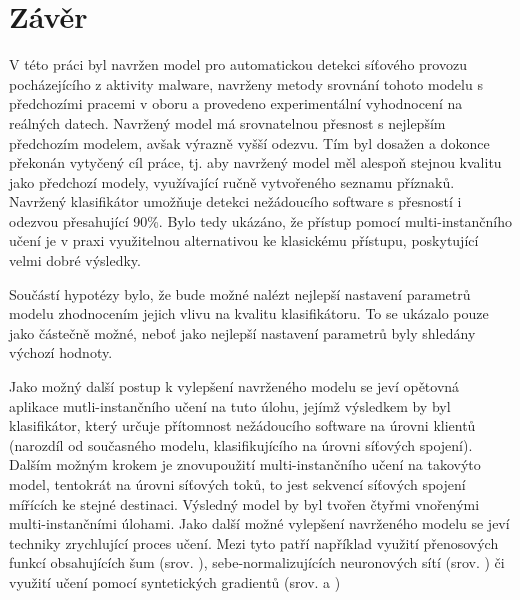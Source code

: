 \chapter*{Závěr}

V této práci byl navržen model pro automatickou detekci síťového provozu pocházejícího z aktivity malware, navrženy metody srovnání tohoto modelu s předchozími pracemi v oboru a provedeno experimentální vyhodnocení na reálných datech. Navržený model má srovnatelnou přesnost s nejlepším předchozím modelem, avšak výrazně vyšší odezvu. Tím byl dosažen a dokonce překonán vytyčený cíl práce, tj. aby navržený model měl alespoň stejnou kvalitu jako předchozí modely, využívající ručně vytvořeného seznamu příznaků. Navržený klasifikátor umožňuje detekci nežádoucího software s přesností i odezvou přesahující 90\%. Bylo tedy ukázáno, že přístup pomocí multi-instančního učení je v praxi využitelnou alternativou ke klasickému přístupu, poskytující velmi dobré výsledky.

Součástí hypotézy bylo, že bude možné nalézt nejlepší nastavení parametrů modelu zhodnocením jejich vlivu na kvalitu klasifikátoru. To se ukázalo pouze jako částečně možné, neboť jako nejlepší nastavení parametrů byly shledány výchozí hodnoty. 

Jako možný další postup k vylepšení navrženého modelu se jeví opětovná aplikace mutli-instančního učení na tuto úlohu, jejímž výsledkem by byl klasifikátor, který určuje přítomnost nežádoucího software na úrovni klientů (narozdíl od současného modelu, klasifikujícího na úrovni síťových spojení). Dalším možným krokem je znovupoužití multi-instančního učení na takovýto model, tentokrát na úrovni síťových toků, to jest sekvencí síťových spojení mířících ke stejné destinaci. Výsledný model by byl tvořen čtyřmi vnořenými multi-instančními úlohami. Jako další možné vylepšení navrženého modelu se jeví techniky zrychlující proces učení. Mezi tyto patří například využití přenosových funkcí obsahujících šum (srov. \cite{gulcehre_noisy_2016}), sebe-normalizujících neuronových sítí (srov. \cite{klambauer_self-normalizing_2017}) či využití učení pomocí syntetických gradientů (srov. \cite{jaderberg_decoupled_2016} a \cite{czarnecki_understanding_2017}) 

